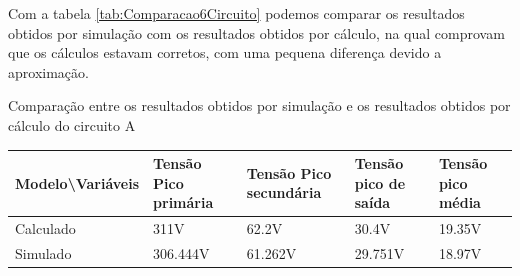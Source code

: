 Com a tabela \ref{tab:Comparacao6Circuito} podemos comparar os resultados obtidos por simulação com os resultados obtidos por cálculo, na qual comprovam que os cálculos estavam corretos, com uma pequena diferença devido a aproximação.

\begin{quadro}[H]
    \centering
    \caption{Comparação entre os resultados obtidos por simulação e os resultados obtidos por cálculo do circuito A}
    \begin{tabular}{|C{0.19\textwidth}|C{0.18\textwidth}|C{0.18\textwidth}|C{0.18\textwidth}|C{0.18\textwidth}|}
        \hline
        \textbf{Modelo\textbackslash{}Variáveis} & \textbf{Tensão Pico primária} & \textbf{Tensão Pico secundária} & \textbf{Tensão pico de saída} & \textbf{Tensão pico média}\\
        \hline
        Calculado & 311V & 62.2V & 30.4V & 19.35V \\
        \hline
        Simulado & 306.444V & 61.262V & 29.751V & 18.97V \\
        \hline
    \end{tabular}
    \vspace{-0.6cm}
    \label{tab:Comparacao6Circuito}
\end{quadro}